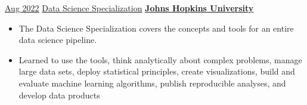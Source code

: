 \documentclass[letterpaper]{DS_class_file} %
\begin{document}
\begin{twenty}
    \twentyitem
	{\href{}{Aug 2022}}
	{}
	{\hspace{0.3cm}\href{https://coursera.org/share/bd6b7bd9ba1f00e2975568b2f471d170}{Data Science Specialization}}
	{\href{https://www.jhu.edu/}{\textbf{Johns Hopkins University}}}
	{}
	{
    \begin{itemize}
        \item The Data Science Specialization covers the concepts and tools for an entire data science pipeline.
        \item Learned to use the tools, think analytically about complex problems, manage large data sets, deploy statistical principles, create visualizations, build and evaluate machine learning algorithms, publish
reproducible analyses, and develop data products
    \end{itemize}
    }
\end{twenty}



    
	
	
\end{document}
